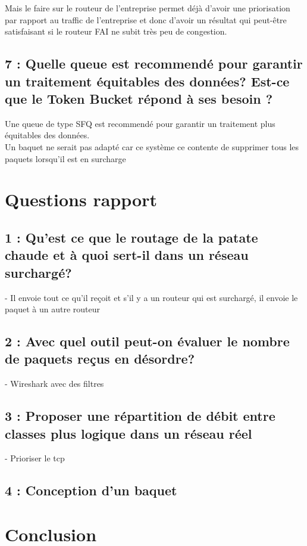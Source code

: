 \documentclass{article}
\begin{document}
Mais le faire sur le routeur de l'entreprise permet déjà d'avoir une priorisation par rapport au traffic de l'entreprise et donc d'avoir un résultat qui peut-être satisfaisant si le routeur FAI ne subit très peu de congestion.

\subsection*{7 : Quelle queue est recommendé pour garantir un traitement équitables des données? Est-ce que le Token Bucket répond à ses besoin ?}

Une queue de type SFQ \cite{SFQ} est recommendé pour garantir un traitement plus équitables des données.\\

Un baquet ne serait pas adapté car ce système ce contente de supprimer tous les paquets lorsqu'il est en surcharge \cite{Bucket}


\section{Questions rapport}

\subsection*{1 : Qu'est ce que le routage de la patate chaude et à quoi sert-il dans un réseau surchargé?}

- Il envoie tout ce qu'il reçoit et s'il y a un routeur qui est surchargé, il envoie le paquet à un autre routeur

\subsection*{2 : Avec quel outil peut-on évaluer le nombre de paquets reçus en désordre?}

- Wireshark avec des filtres

\subsection*{3 : Proposer une répartition de débit entre classes plus logique dans un réseau réel}

- Prioriser le tcp

\subsection*{4 : Conception d'un baquet}




\section{Conclusion}


%

\printbibliography 
\end{document}
